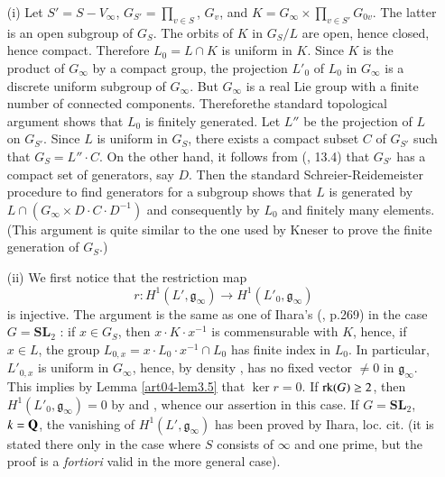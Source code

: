 \smallskip

\begin{itemize}
\item[(i)] Let $S'=S-V_{\infty}$, $G_{S'}=\prod_{v\in S}$, $G_{v}$, and $K=G_{\infty}\times \prod_{v\in S'}G_{0v}$. The latter is an open subgroup of $G_{S}$. The orbits of $K$ in $G_{S}/L$ are open, hence closed, hence compact. Therefore $L_{0}=L\cap K$ is uniform in $K$. Since $K$ is the product of $G_{\infty}$ by a compact group, the projection $L'_{0}$ of $L_{0}$ in $G_{\infty}$ is a discrete uniform subgroup of $G_{\infty}$. But $G_{\infty}$ is a real Lie group with a finite number of connected components. Therefore\pageoriginale the standard topological argument shows that $L_{0}$ is finitely generated. Let $L''$ be the projection of $L$ on $G_{S'}$. Since $L$ is uniform in $G_{S}$, there exists a compact subset $C$ of $G_{S'}$ such that $G_{S}=L''\cdot C.$ On the other hand, it follows from (\cite{art04-key9}, 13.4) that $G_{S'}$ has a compact set of generators, say $D$. Then the standard Schreier-Reidemeister procedure to find generators for a subgroup shows that $L$ is generated by $L\cap (G_{\infty}\times D\cdot C\cdot D^{-1})$ and consequently by $L_{0}$ and finitely many elements. (This argument is quite similar to the one used by Kneser \cite{art04-key17} to prove the finite generation of $G_{S}$.)

\item[(ii)] We first notice that the restriction map 
$$
r:H^{1}(L',\mathfrak{g}_{\infty})\to H^{1}(L'_{0},\mathfrak{g}_{\infty})
$$ 
is injective. The argument is the same as one of Ihara's (\cite{art04-key14}, p.269) in the case $G=\mathbf{SL}_{2}$ : if $x\in G_{S}$, then $x\cdot K\cdot x^{-1}$ is commensurable with $K$, hence, if $x\in L$, the group $L_{0,x}=x\cdot L_{0}\cdot x^{-1}\cap L_{0}$ has finite index in $L_{0}$. In particular, $L'_{0,x}$ is uniform in $G_{\infty}$, hence, by density \cite{art04-key4}, has no fixed vector $\neq 0$ in $\mathfrak{g}_{\infty}$. This implies by Lemma \ref{art04-lem3.5} that $\ker r=0$. If $\operatorname{\mathrm{rk}}(G)\geq 2$, then $H^{1}(L'_{0},\mathfrak{g}_{\infty})=0$ by \cite{art04-key32} and \cite{art04-key33}, whence our assertion in this case. If $G=\mathbf{SL}_{2}$, $k=\mathbf{Q}$, the vanishing of $H^{1}(L',\mathfrak{g}_{\infty})$ has been proved by Ihara, loc. cit. (it is stated there only in the case where $S$ consists of $\infty$ and one prime, but the proof is a {\em fortiori} valid in the more general case).
\end{itemize}

